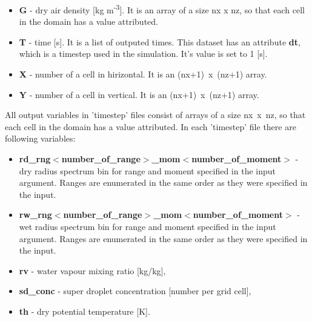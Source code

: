 \documentclass[11pt]{article}
\begin{document}
\begin{itemize}
\item \textbf{G} - dry air density [kg m\textsuperscript{-3}]. It is an array of a size nx x nz, so that each cell in the domain has a value attributed.
\item \textbf{T} - time [s]. It is a list of outputed times. This dataset has an attribute \textbf{dt}, which is a timestep used in the simulation. It's value is set to 1 [s]. 
\item \textbf{X} - number of a cell in hirizontal. It is an (nx+1)~x~(nz+1) array.
\item \textbf{Y} - number of a cell in vertical. It is an (nx+1)~x~(nz+1) array.
\end{itemize}

All output variables in 'timestep' files consist of arrays of a size nx~x~nz, so that each cell in the domain has a value attributed. In each 'timestep' file there are following variables:

\begin{itemize}
\item \textbf{rd\_rng$<$number\_of\_range$>$\_mom$<$number\_of\_moment$>$} - dry radius spectrum bin for range and moment specified in the input argument. Ranges are enumerated in the same order as they were specified in the input. 

\item \textbf{rw\_rng$<$number\_of\_range$>$\_mom$<$number\_of\_moment$>$} - wet radius spectrum bin for range and moment specified in the input argument. Ranges are enumerated in the same order as they were specified in the input.  

\item \textbf{rv} - water vapour mixing ratio [kg/kg],

\item \textbf{sd\_conc} - super droplet concentration [number per grid cell],

\item \textbf{th} - dry potential temperature [K].

\end{itemize}
\end{document}

